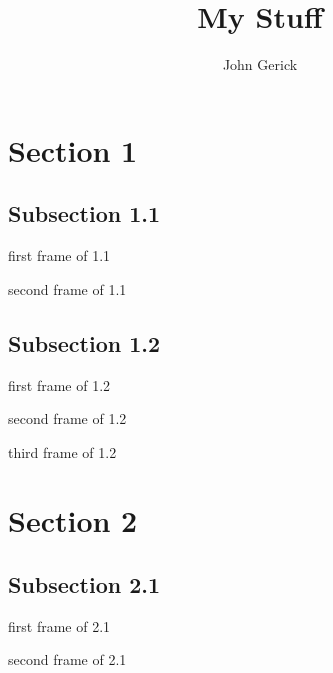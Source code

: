 \documentclass[12pt,a4paper,compress]{beamer}
\author{John Gerick}
\title{My Stuff}
\begin{document}
\begin{frame}
  \titlepage
\end{frame}

\begin{frame}
  \tableofcontents[hideallsubsections]
\end{frame}

\section{Section 1}
\begin{frame}
  \tableofcontents[sections={1}]
\end{frame}

\subsection{Subsection 1.1}
\begin{frame}
  first frame of 1.1
\end{frame}
\begin{frame}
  second frame of 1.1
\end{frame}

\subsection{Subsection 1.2}
\begin{frame}
  first frame of 1.2
\end{frame}
\begin{frame}
  second frame of 1.2
\end{frame}
\begin{frame}
  third frame of 1.2
\end{frame}

\section{Section 2}
\begin{frame}
  \tableofcontents[sections={2}]
\end{frame}

\subsection{Subsection 2.1}
\begin{frame}
  first frame of 2.1
\end{frame}

\begin{frame}
  second frame of 2.1
\end{frame}
\end{document}
